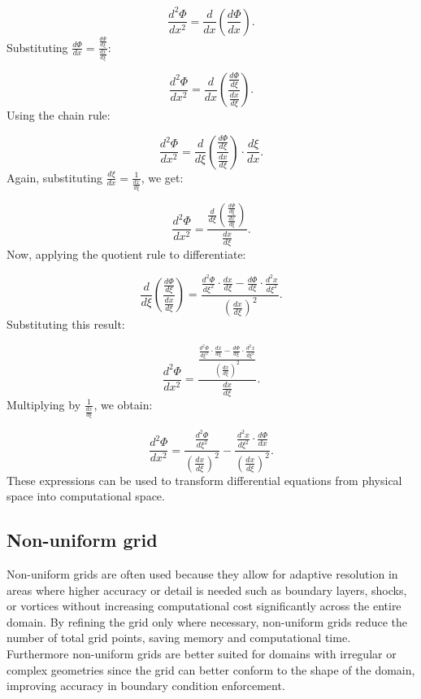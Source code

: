 \documentclass{article}
\begin{document}
\[
\frac{d^2\Phi}{dx^2} = \frac{d}{dx} \left( \frac{d\Phi}{dx} \right).
\]
Substituting \(\frac{d\Phi}{dx} = \frac{\frac{d\Phi}{d\xi}}{\frac{dx}{d\xi}}\):

\[
\frac{d^2\Phi}{dx^2} = \frac{d}{dx} \left( \frac{\frac{d\Phi}{d\xi}}{\frac{dx}{d\xi}} \right).
\]
Using the chain rule:

\[
\frac{d^2\Phi}{dx^2} = \frac{d}{d\xi} \left( \frac{\frac{d\Phi}{d\xi}}{\frac{dx}{d\xi}} \right) \cdot \frac{d\xi}{dx}.
\]
Again, substituting \( \frac{d\xi}{dx} = \frac{1}{\frac{dx}{d\xi}} \), we get:

\[
\frac{d^2\Phi}{dx^2} = \frac{\frac{d}{d\xi} \left( \frac{\frac{d\Phi}{d\xi}}{\frac{dx}{d\xi}} \right)}{\frac{dx}{d\xi}}.
\]
Now, applying the quotient rule to differentiate:

\[
\frac{d}{d\xi} \left( \frac{\frac{d\Phi}{d\xi}}{\frac{dx}{d\xi}} \right) =
\frac{\frac{d^2\Phi}{d\xi^2} \cdot \frac{dx}{d\xi} - \frac{d\Phi}{d\xi} \cdot \frac{d^2x}{d\xi^2}}{\left( \frac{dx}{d\xi} \right)^2}.
\]
Substituting this result:

\[
\frac{d^2\Phi}{dx^2} = \frac{\frac{\frac{d^2\Phi}{d\xi^2} \cdot \frac{dx}{d\xi} - \frac{d\Phi}{d\xi} \cdot \frac{d^2x}{d\xi^2}}{\left( \frac{dx}{d\xi} \right)^2}}{\frac{dx}{d\xi}}.
\]
Multiplying by \( \frac{1}{\frac{dx}{d\xi}} \), we obtain:

\begin{equation}
\frac{d^2\Phi}{dx^2} = \frac{\frac{d^2\Phi}{d\xi^2}}{\left( \frac{dx}{d\xi} \right)^2} - \frac{\frac{d^2x}{d\xi^2} \cdot \frac{d\Phi}{dx}}{\left( \frac{dx}{d\xi} \right)^2}.
\end{equation}
These expressions can be used to transform differential equations from physical space into computational space.

\subsection{Non-uniform grid}
Non-uniform grids are often used because they allow for adaptive resolution in areas where higher accuracy or detail is needed 
such as boundary layers, shocks, or vortices without increasing computational cost significantly across the entire domain. 
By refining the grid only where necessary, non-uniform grids reduce the number of total grid points, saving memory and computational time.
Furthermore non-uniform grids are better suited for domains with irregular or complex geometries since the grid can better conform to 
the shape of the domain, improving accuracy in boundary condition enforcement.
\end{document}
